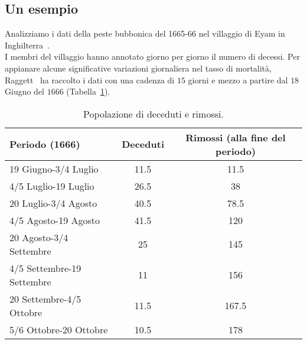\newpage
\subsection{Un esempio}
Analizziamo i dati della peste bubbonica del 1665-66 nel villaggio di Eyam in Inghilterra~\cite{raggett1982stochastic}. \\
I membri del villaggio hanno annotato giorno per giorno il numero di decessi. Per appianare alcune significative variazioni giornaliera nel tasso di mortalit\`a,  Raggett~\cite{raggett1982stochastic} ha raccolto  i dati con una cadenza di $15$ giorni e mezzo a partire dal $18$ Giugno del $1666$ (Tabella~\ref{table::1}).
\begin{table}[!ht]
\centering
\caption{Popolazione di deceduti e rimossi.}
\label{table::1}
\begin{tabular}{l | c | c }

Periodo (1666) & Deceduti & Rimossi (alla fine del periodo) \\
\hline

19 Giugno-3/4 Luglio & 11.5 & 11.5\\
4/5 Luglio-19 Luglio & 26.5 & 38\\ 
20 Luglio-3/4 Agosto & 40.5 & 78.5\\
4/5 Agosto-19 Agosto & 41.5 & 120\\
20 Agosto-3/4 Settembre & 25 & 145\\
4/5 Settembre-19 Settembre & 11 & 156\\
20 Settembre-4/5 Ottobre & 11.5 & 167.5\\
5/6 Ottobre-20 Ottobre & 10.5 & 178\\

\end{tabular}

\end{table}

